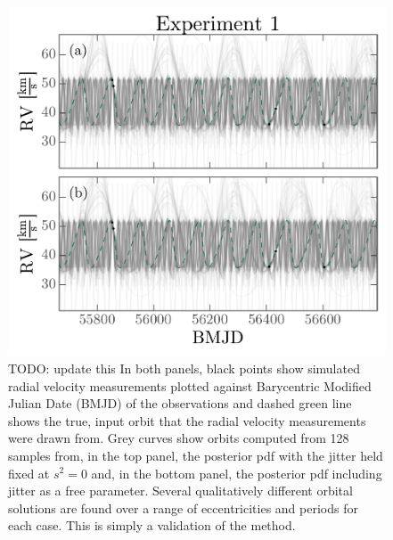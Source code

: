 \documentclass[manuscript, letterpaper]{aastex6}
\newcommand{\todo}[1]{{\color{red}TODO: #1}}
\begin{document}
\begin{figure}[p]
\begin{center}
\includegraphics[width=\textwidth]{figures/exp1-rv-curves.pdf}
\end{center}
\caption{%
\todo{update this}
In both panels, black points show simulated radial velocity measurements plotted
against Barycentric Modified Julian Date (BMJD) of the observations and dashed
green line shows the true, input orbit that the radial velocity measurements
were drawn from.
Grey curves show orbits computed from 128 samples from, in the top panel, the
posterior pdf with the jitter held fixed at $s^2 = 0$ and, in the bottom panel,
the posterior pdf including jitter as a free parameter.
Several qualitatively different orbital solutions are found over a range of
eccentricities and periods for each case.
This is simply a validation of the method.
\label{fig:exp1-rv}}
\end{figure}
\end{document}
